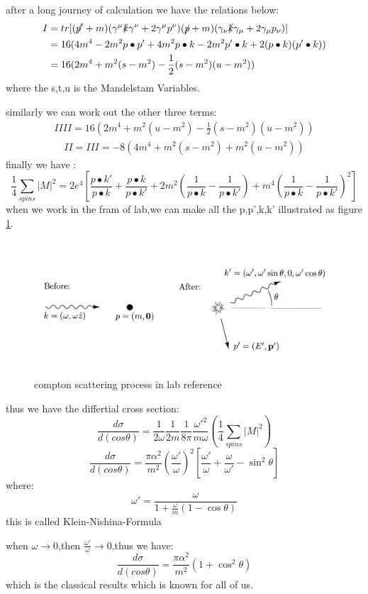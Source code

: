 after a long journey of calculation we have the relations below:
\begin{align}
\notag I&=tr[(\slashed{p'}+m)(\gamma^\mu\slashed{k}\gamma^\nu+2\gamma^\mu p^\nu)(\slashed{p}+m)(\gamma_\nu\slashed{k}\gamma_\mu+2\gamma_\mu p_\nu)]\\
\notag&=16(4m^4-2m^2p\bullet p'+4m^2p\bullet k-2m^2p'\bullet k+2(p\bullet k)(p'\bullet k))\\
&=16(2m^4+m^2(s-m^2)-\frac{1}{2}(s-m^2)(u-m^2))
\end{align}
where the s,t,u is the Mandelstam Variables.\par
similarly we can work out the other three terms:
\begin{align}
IIII=16(2m^4+m^2(u-m^2)-\frac{1}{2}(s-m^2)(u-m^2))
\end{align}
\begin{align}
II=III=-8(4m^4+m^2(s-m^2)+m^2(u-m^2))
\end{align}
finally we have :
\[\frac{1}{4}\sum_{spins}|M|^2=2e^4[\frac{p\bullet k'}{p\bullet k}+\frac{p\bullet k}{p\bullet k'}+2m^2(\frac{1}{p\bullet k}-\frac{1}{p\bullet k'})+m^4(\frac{1}{p\bullet k}-\frac{1}{p\bullet k'})^2]\]
when we work in the fram of lab,we can make all the p,p',k,k'  illustrated as figure \ref{fig:compton2}. \par
\begin{figure}
\begin{center}
\includegraphics[height=5cm]{./figures/compton2.PNG}
\caption{compton scattering process in lab reference}
\label{fig:compton2}
\end{center}
\end{figure}
thus we have the differtial cross section:
\[\frac{d\sigma}{d(cos\theta)}=\frac{1}{2\omega}\frac{1}{2m}\frac{1}{8\pi}\frac{\omega'^2}{m\omega}(\frac{1}{4}\sum_{spins}|M|^2)\]
\[\frac{d\sigma}{d(cos\theta)}=\frac{\pi \alpha^2}{m^2}(\frac{\omega'}{\omega})^2[\frac{\omega'}{\omega}+\frac{\omega}{\omega'}-\sin ^2\theta]\]
where:
\[\omega'=\frac{\omega}{1+\frac{\omega}{m}(1-\cos\theta)}\]
this is called Klein-Nishina-Formula\par
when $\omega\rightarrow 0$,then $\frac{\omega'}{\omega}\rightarrow 0$,thus we have:
\[\frac{d\sigma}{d(cos\theta)}=\frac{\pi \alpha^2}{m^2}(1+\cos^2\theta)\]
which is the classical results which is known for all of us.\par


